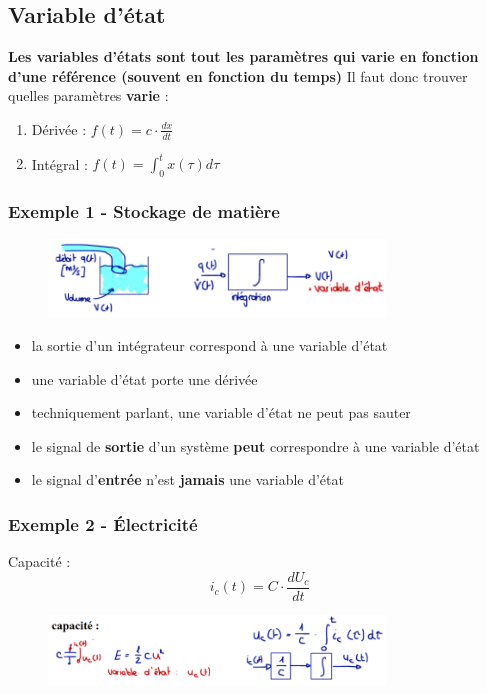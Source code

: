 \documentclass[document.tex]{subfiles}
\begin{document}
\subsection{Variable d'état}
\begin{center}
\textbf{Les variables d'états sont tout les paramètres qui varie en fonction d'une référence (souvent en fonction du temps)}
Il faut donc trouver quelles paramètres \textbf{varie} :
\begin{enumerate}
\item \large Dérivée : $\boxed{f(t)= c \cdot \frac{d x}{d t}}$
\item \large Intégral : $\boxed{f(t) = \int_0^t x(\tau)d\tau}$
\end{enumerate}
\end{center}
\subsubsection{Exemple 1 - Stockage de matière}
\begin{figure}[H]
    \centering
    \includegraphics[width=0.8\textwidth]{Include/Figure/1.png}
\end{figure}
\begin{itemize}
\item la sortie d'un intégrateur correspond à une variable d'état
\item une variable d'état porte une dérivée
\item techniquement parlant, une variable d'état ne peut pas sauter
\item le signal de \textbf{sortie} d'un système \textbf{peut} correspondre à une variable d'état
\item le signal d'\textbf{entrée} n'est \textbf{jamais} une variable d'état
\end{itemize}

\subsubsection{Exemple 2 - Électricité}

Capacité :
\begin{equation}
	i_c(t) = C \cdot \frac{dU_c}{dt}
\end{equation}
\begin{figure}[H]
    \centering
    \includegraphics[width=0.8\textwidth]{Include/Figure/4.png}
\end{figure}
\end{document}
